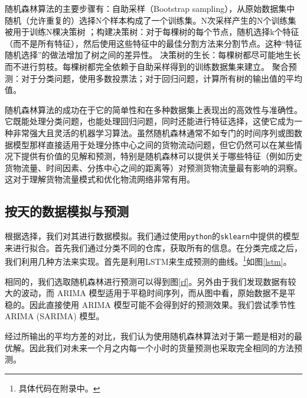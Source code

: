 \documentclass[UTF8]{article}%
\begin{document}
随机森林算法的主要步骤有：自助采样（Bootstrap sampling），从原始数据集中随机（允许重复的）选择N个样本构成了一个训练集。N次采样产生的N个训练集被用于训练N棵决策树
；构建决策树：对于每棵树的每个节点，随机选择k个特征（而不是所有特征），然后使用这些特征中的最佳分割方法来分割节点。这种“特征随机选择”的做法增加了树之间的差异性。
决策树的生长：每棵树都尽可能地生长而不进行剪枝。每棵树都完全依赖于自助采样得到的训练数据集来建立。
聚合预测：对于分类问题，使用多数投票法；对于回归问题，计算所有树的输出值的平均值。

随机森林算法的成功在于它的简单性和在多种数据集上表现出的高效性与准确性。它既能处理分类问题，也能处理回归问题，同时还能进行特征选择，这使它成为一种非常强大且灵活的机器学习算法。虽然随机森林通常不如专门的时间序列或图数据模型那样直接适用于处理分拣中心之间的货物流动问题，但它仍然可以在某些情况下提供有价值的见解和预测，特别是随机森林可以提供关于哪些特征（例如历史货物流量、时间因素、分拣中心之间的距离等）对预测货物流量最有影响的洞察。这对于理解货物流量模式和优化物流网络非常有用。


\subsection{按天的数据模拟与预测}
根据选择，我们对其进行数据模拟。我们通过使用{\tt python}的{\tt sklearn}中提供的模型来进行拟合。首先我们通过分类不同的仓库，获取所有的信息。在分类完成之后，我们利用几种方法来实现。首先是利用LSTM来生成预测的曲线。\footnote{具体代码在附录中。}如图\ref{lstm}。

相同的，我们选取随机森林进行预测可以得到图\ref{rf}。另外由于我们发现数据有较大的波动，而 ARIMA 模型适用于平稳时间序列，而从图中看，原始数据不是平稳的。因此直接使用 ARIMA 模型可能不会得到好的预测效果。我们尝试季节性 ARIMA (SARIMA) 模型。

经过所输出的平均方差的对比，我们认为使用随机森林算法对于第一题是相对的最优解。因此我们对未来一个月之内每一个小时的货量预测也采取完全相同的方法预测。
\end{document}

